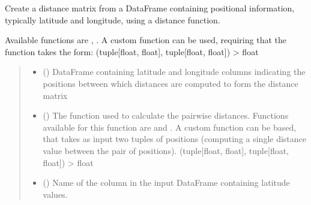 \documentclass[letterpaper,10pt,english]{sphinxmanual}
\begin{document}
\begin{fulllineitems}
\label{\detokenize{misc:glomar_gridding.distances.calculate_distance_matrix}}
\pysigstartsignatures
\pysiglinewithargsret
{}
{\sphinxparamcomma {}\sphinxparamcomma {}\sphinxparamcomma {}}
{}
\pysigstopsignatures
\sphinxAtStartPar
Create a distance matrix from a DataFrame containing positional information,
typically latitude and longitude, using a distance function.

\sphinxAtStartPar
Available functions are , . A
custom function can be used, requiring that the function takes the form:
(tuple{[}float, float{]}, tuple{[}float, float{]}) \sphinxhyphen{}\textgreater{} float
\begin{quote}\begin{description}
\begin{itemize}
\item {}
\sphinxAtStartPar
{} () \textendash{} DataFrame containing latitude and longitude columns indicating the
positions between which distances are computed to form the distance
matrix

\item {}
\sphinxAtStartPar
{} () \textendash{} The function used to calculate the pairwise distances. Functions
available for this function are  and
.
A custom function can be based, that takes as input two tuples of
positions (computing a single distance value between the pair of
positions). (tuple{[}float, float{]}, tuple{[}float, float{]}) \sphinxhyphen{}\textgreater{} float

\item {}
\sphinxAtStartPar
{} () \textendash{} Name of the column in the input DataFrame containing latitude values.


\end{itemize}
\end{description}
\end{quote}
\end{fulllineitems}
\end{document}
